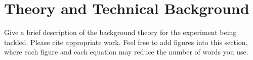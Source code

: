 
\section{Theory and Technical Background}
\label{sec:theory-and-technical-background}
Give a brief description of the background theory for the experiment being tackled.
Please cite appropriate work.
Feel free to add figures into this section, where
each figure and each equation may reduce the number of words you use.
